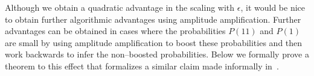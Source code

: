 \documentclass[aps,amsmath,onecolumn,amssymb,notitlepage]{revtex4-1}
\begin{document}
Although we obtain a quadratic advantage in the scaling with $\epsilon$, it would be nice to obtain further algorithmic advantages using amplitude amplification.  Further advantages can be obtained in cases where the probabilities $P(11)$ and $P(1)$ are small by using amplitude amplification to boost these probabilities and then work backwards to infer the non--boosted probabilities.  Below we formally prove a theorem to this effect that formalizes a similar claim made informally in~\cite{WHW15}.
\end{document}
